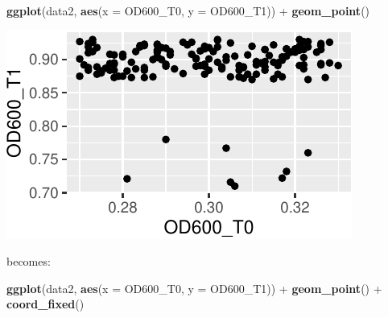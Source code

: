 \documentclass[]{book}
\newenvironment{Shaded}{}{}
\newcommand{\DataTypeTok}[1]{\textcolor[rgb]{0.56,0.13,0.00}{#1}}
\newcommand{\KeywordTok}[1]{\textcolor[rgb]{0.00,0.44,0.13}{\textbf{#1}}}
\newcommand{\NormalTok}[1]{#1}
\newcommand{\OperatorTok}[1]{\textcolor[rgb]{0.40,0.40,0.40}{#1}}
\newcommand{\StringTok}[1]{\textcolor[rgb]{0.25,0.44,0.63}{#1}}
\begin{document}
\begin{Shaded}
\begin{Highlighting}[]
\KeywordTok{ggplot}\NormalTok{(data2, }\KeywordTok{aes}\NormalTok{(}\DataTypeTok{x =}\NormalTok{ OD600_T0, }\DataTypeTok{y =}\NormalTok{ OD600_T1)) }\OperatorTok{+}
\StringTok{  }\KeywordTok{geom_point}\NormalTok{()}
\end{Highlighting}
\end{Shaded}

\begin{center}\includegraphics[width=\textwidth]{TRES-Tidy-Tutorial_files/figure-latex/unnamed-chunk-129-1} \end{center}

becomes:

\begin{Shaded}
\begin{Highlighting}[]
\KeywordTok{ggplot}\NormalTok{(data2, }\KeywordTok{aes}\NormalTok{(}\DataTypeTok{x =}\NormalTok{ OD600_T0, }\DataTypeTok{y =}\NormalTok{ OD600_T1)) }\OperatorTok{+}
\StringTok{  }\KeywordTok{geom_point}\NormalTok{() }\OperatorTok{+}
\StringTok{  }\KeywordTok{coord_fixed}\NormalTok{()}
\end{Highlighting}
\end{Shaded}
\end{document}
